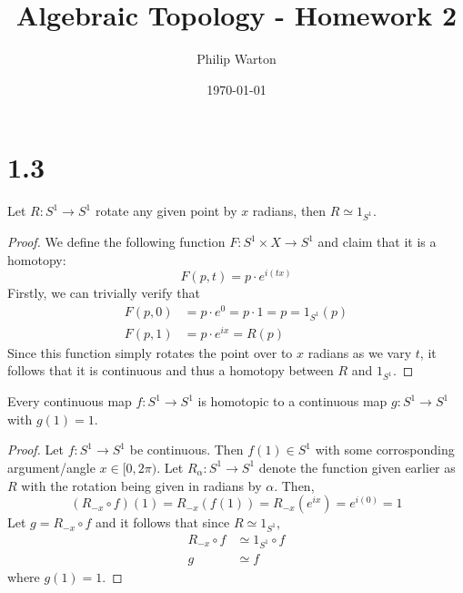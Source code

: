 \documentclass{article}
\theoremstyle{definition}
\begin{document}
\title{Algebraic Topology - Homework 2}
\author{Philip Warton}
\date{\today}
\maketitle
\section*{1.3}
    \begin{mdframed}[]
        Let $R : S^1 \rightarrow S^1$ rotate any given point by $x$ radians, then $R \simeq 1_{S^1}$.
    \end{mdframed}
    \begin{proof}
        We define the following function $F:S^1 \times X \rightarrow S^1$ and claim that it is a homotopy:
        \[
            F(p,t) = p \cdot e^{i(tx)}
        \]
        Firstly, we can trivially verify that
        \begin{align*}
            F(p,0) &= p \cdot e^0 = p \cdot 1 = p = 1_{S^1}(p) \\
            F(p,1) &= p \cdot e^{ix} = R(p)
        \end{align*}
        Since this function simply rotates the point over to $x$ radians as we vary $t$, it follows that it is 
        continuous and thus a homotopy between $R$ and $1_{S^1}$.
    \end{proof}
    \begin{mdframed}[]
        Every continuous map $f: S^1 \rightarrow S^1$ is homotopic to a continuous map $g:S^1 \rightarrow S^1$
        with $g(1) = 1$.
    \end{mdframed}
    \begin{proof}
        Let $f:S^1 \rightarrow S^1$ be continuous. Then $f(1) \in S^1$ with some corrosponding argument/angle
        $x \in [0,2\pi)$. Let $R_{\alpha} : S^1 \rightarrow S^1$ denote the function given earlier as $R$ with 
        the rotation being given in radians by $\alpha$. Then,
        \[
            (R_{-x} \circ f)(1) = R_{-x}(f(1)) = R_{-x}(e^{ix}) = e^{i(0)} = 1
        \]
        Let $g = R_{-x} \circ f$ and it follows that since $R \simeq 1_{S^1}$,
        \begin{align*}
            R_{-x} \circ f &\simeq 1_{S^1} \circ f \\
            g &\simeq f
        \end{align*}
        where $g(1) = 1$.
    \end{proof}
\end{document}
